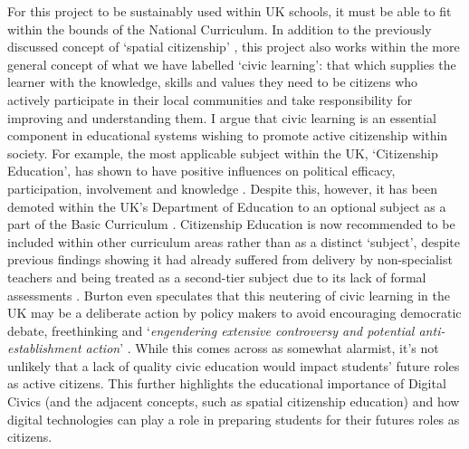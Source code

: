 For this project to be sustainably used within UK schools, it must be able to fit within the bounds of the National Curriculum. In addition to the previously discussed concept of `spatial citizenship' \citep{Gryl2012}, this project also works within the more general concept of what we have labelled `civic learning': that which supplies the learner with the knowledge, skills and values they need to be citizens who actively participate in their local communities and take responsibility for improving and understanding them. I argue that civic learning is an essential component in educational systems wishing to promote active citizenship within society. For example, the most applicable subject within the UK, `Citizenship Education', has shown to have positive influences on political efficacy, participation, involvement and knowledge \citep{whiteley2012}. Despite this, however, it has been demoted within the UK’s Department of Education to an optional subject as a part of the Basic Curriculum \citep{GovEducation2011}. Citizenship Education is now recommended to be included within other curriculum areas rather than as a distinct `subject’, despite previous findings showing it had already suffered from delivery by non-specialist teachers and being treated as a second-tier subject due to its lack of formal assessments \citep{Burton2015, Ofsted2013}. Burton even speculates that this neutering of civic learning in the UK may be a deliberate action by policy makers to avoid encouraging democratic debate, freethinking and ‘\textit{engendering extensive controversy and potential anti-establishment action}’ \citep{Burton2015}. While this comes across as somewhat alarmist, it's not unlikely that a lack of quality civic education would impact students' future roles as active citizens. This further highlights the educational importance of Digital Civics (and the adjacent concepts, such as spatial citizenship education) and how digital technologies can play a role in preparing students for their futures roles as citizens.

